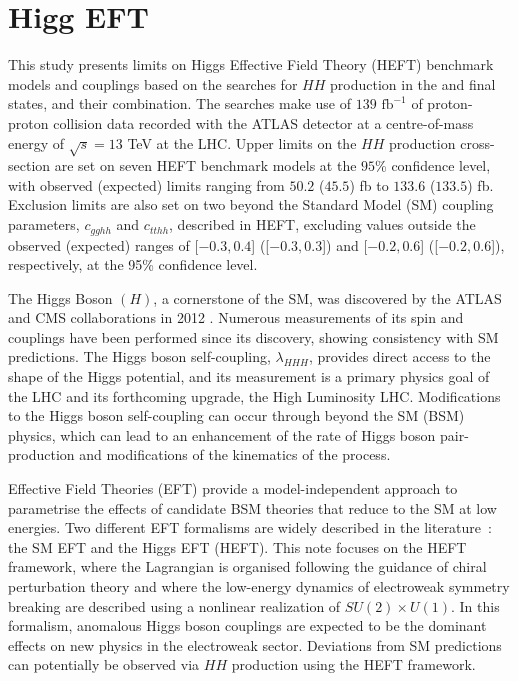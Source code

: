 \documentclass[twoside,11pt]{report}
\begin{document}
\section{Higg EFT}
This study presents limits on Higgs Effective Field Theory (HEFT) benchmark models 
and couplings based on the searches for $HH$ production in the \bbyy and \bbtautau final states, 
and their combination. The searches make use of $139$ $\textrm{fb}^{-1}$ of proton-proton collision 
data recorded with the ATLAS detector at a centre-of-mass energy of $\sqrt{s}=13$ TeV at the LHC. 
Upper limits on the $HH$ production cross-section are set on seven HEFT benchmark models at the $95$\% confidence level, 
with observed (expected) limits ranging from $50.2$ ($45.5$) fb to $133.6$ ($133.5$) fb. 
Exclusion limits are also set on two beyond the Standard Model (SM) coupling parameters, 
$c_{gghh}$ and $c_{tthh}$, described in HEFT, excluding values outside the observed (expected) 
ranges of [$-0.3, 0.4$] ([$-0.3, 0.3$]) and [$-0.2, 0.6$] ([$-0.2, 0.6$]), respectively, at the 95\% confidence level.

The Higgs Boson $(H)$, a cornerstone of the SM, was discovered by the ATLAS and CMS collaborations in 2012 \cite{HIGG-2012-27,CMS-HIG-12-028}. 
Numerous measurements of its spin and couplings have been 
performed \cite{HIGG-2013-17-witherratum,CMS-HIG-14-018,ATLAS-CONF-2020-027} since its discovery, 
showing consistency with SM predictions. The Higgs boson self-coupling, $\lambda_{HHH}$, provides 
direct access to the shape of the Higgs potential, and its measurement is a primary physics goal of 
the LHC and its forthcoming upgrade, the High Luminosity LHC. Modifications to the Higgs boson self-coupling can 
occur through beyond the SM (BSM) physics, which can lead to an enhancement of the rate of Higgs boson 
pair-production and modifications of the kinematics of the process. 
\newline



Effective Field Theories (EFT) provide a model-independent approach to parametrise the effects of 
candidate BSM theories that reduce to the SM at low energies. Two different EFT formalisms are 
widely described in the literature~\cite{MICCO2020100045, Grzadkowski:2010es, Cohen:2020xca}: 
the SM EFT and the Higgs EFT (HEFT). This note focuses on the HEFT framework, where the 
Lagrangian is organised following the guidance of chiral perturbation theory and 
where the low-energy dynamics of electroweak symmetry breaking are described using a nonlinear 
realization of $SU(2)\times U(1)$. In this formalism, anomalous Higgs boson couplings are 
expected to be the dominant effects on new physics in the electroweak sector.
Deviations from SM predictions can potentially be observed via $HH$ production using the HEFT framework.
\newline
\end{document}
